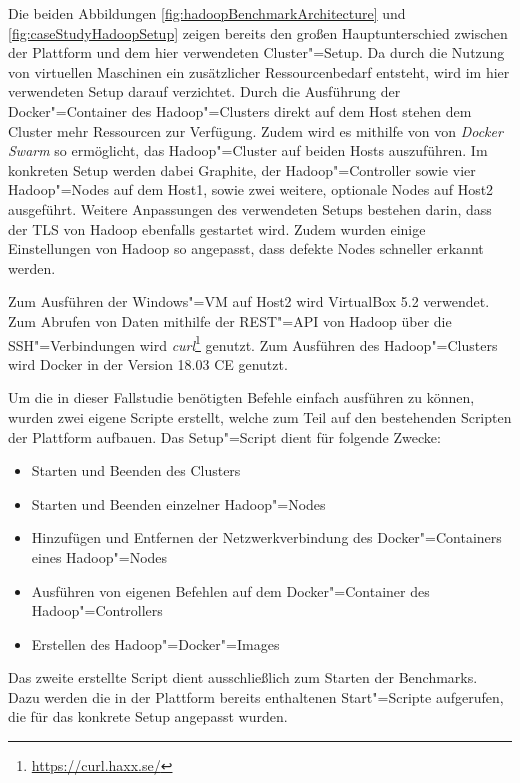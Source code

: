 Die beiden Abbildungen \autoref{fig:hadoopBenchmarkArchitecture} und \autoref{fig:caseStudyHadoopSetup} zeigen bereits den großen Hauptunterschied zwischen der Plattform und dem hier verwendeten Cluster"=Setup.
Da durch die Nutzung von virtuellen Maschinen ein zusätzlicher Ressourcenbedarf entsteht, wird im hier verwendeten Setup darauf verzichtet.
Durch die Ausführung der Docker"=Container des Hadoop"=Clusters direkt auf dem Host stehen dem Cluster mehr Ressourcen zur Verfügung.
Zudem wird es mithilfe von von \emph{Docker Swarm} so ermöglicht, das Hadoop"=Cluster auf beiden Hosts auszuführen.
Im konkreten Setup werden dabei Graphite, der Hadoop"=Controller sowie vier Hadoop"=Nodes auf dem Host1, sowie zwei weitere, optionale Nodes auf Host2 ausgeführt.
Weitere Anpassungen des verwendeten Setups bestehen \uA darin, dass der \ac{TLS} von Hadoop ebenfalls gestartet wird.
Zudem wurden einige Einstellungen von Hadoop so angepasst, dass defekte Nodes schneller erkannt werden.

Zum Ausführen der Windows"=VM auf Host2 wird VirtualBox 5.2 verwendet.
Zum Abrufen von Daten mithilfe der REST"=API von Hadoop über die SSH"=Verbindungen wird \emph{curl}\footnote{\url{https://curl.haxx.se/}} genutzt.
Zum Ausführen des Hadoop"=Clusters wird Docker in der Version 18.03 CE genutzt.

Um die in dieser Fallstudie benötigten Befehle einfach ausführen zu können, wurden zwei eigene Scripte erstellt, welche zum Teil auf den bestehenden Scripten der Plattform aufbauen.
Das Setup"=Script dient für folgende Zwecke:

\begin{itemize}
    \item Starten und Beenden des Clusters
    \item Starten und Beenden einzelner Hadoop"=Nodes
    \item Hinzufügen und Entfernen der Netzwerkverbindung des Docker"=Containers eines Hadoop"=Nodes
    \item Ausführen von eigenen Befehlen auf dem Docker"=Container des Hadoop"=Controllers
    \item Erstellen des Hadoop"=Docker"=Images
\end{itemize}

Das zweite erstellte Script dient ausschließlich zum Starten der Benchmarks.
Dazu werden die in der Plattform bereits enthaltenen Start"=Scripte aufgerufen, die für das konkrete Setup angepasst wurden.
